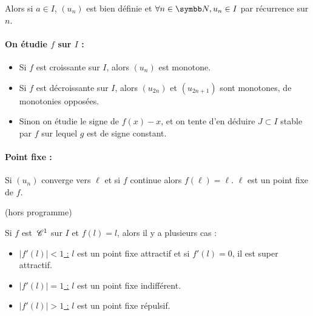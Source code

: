 Alors si $a \in I$, $(u_n)$ est bien définie et $\forall n \in \N, u_n \in I$ par récurrence 
sur $n$. 

\paragraph{On étudie $f$ sur $I$ :}
\begin{itemize}
    \item Si $f$ est croissante sur $I$, alors $(u_n)$ est monotone.
    \item Si $f$ est décroissante sur $I$, alors $(u_{2n})$ et $(u_{2n + 1})$ sont monotones, de 
        monotonies opposées.
    \item Sinon on étudie le signe de $f(x) - x$, et on tente d'en déduire $J \subset I$ stable
        par $f$ sur lequel $g$ est de signe constant. 
\end{itemize}

\paragraph{Point fixe :}
Si $(u_n)$ converge vers $\ell$ et si $f$ continue alors $f(\ell) = \ell$. $\ell$ est un point fixe de $f$. \\

\begin{remarque}
    (hors programme)

    Si $f$ est $\,\mathscr C^{1}$ sur $I$ et $f(l) = l$, alors il y a plusieurs cas : 

    \begin{itemize}
        \item \uline{$|f'(l)| < 1$ :}
         $l$ est un point fixe attractif et si $f'(l) = 0$, il est super attractif. 

        \item \uline{$|f'(l)| = 1$ :}
        $l$ est un point fixe indifférent. 

        \item \uline{$|f'(l)| > 1$ :}
        $l$ est un point fixe répulsif.
    \end{itemize}
\end{remarque}

